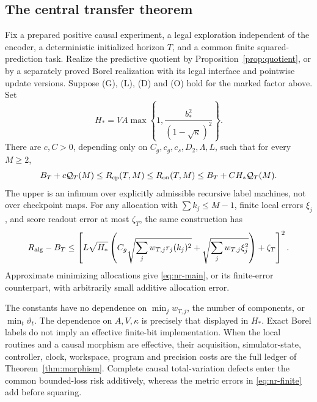 \subsection{The central transfer theorem}
\begin{theorem}\label{thm:nonreset}
Fix a prepared positive causal experiment, a legal exploration independent of the encoder, a deterministic initialized horizon $T$, and a common finite squared-prediction task. Realize the predictive quotient by Proposition~\ref{prop:quotient}, or by a separately proved Borel realization with its legal interface and pointwise update versions. Suppose \textup{(G)}, \textup{(L)}, \textup{(D)} and \textup{(O)} hold for the marked factor above. Set
\begin{equation}\label{eq:nr-H}
 H_*=VA\max\left\{1,\frac{b_*^2}{(1-\sqrt\kappa)^2}\right\}.
\end{equation}
There are $c,C>0$, depending only on $C_g,c_g,c_s,D_2,\Lambda,L$, such that for every $M\ge2$,
\begin{equation}\label{eq:nr-main}
 B_T+c\mathcal Q_T(M)\le R_{\mathrm{cp}}(T,M)\le R_{\mathrm{on}}(T,M)
                 \le B_T+C H_*\mathcal Q_T(M).
\end{equation}
The upper is an infimum over explicitly admissible recursive label machines, not over checkpoint maps. For any allocation with $\sum k_j\le M-1$, finite local errors $\xi_j$, and score readout error at most $\zeta_T$, the same construction has
\begin{equation}\label{eq:nr-finite}
 R_{\rm alg}-B_T\le
 \left[L\sqrt{H_*}\left(C_g\sqrt{\sum_jw_{T,j}r_j(k_j)^2}
                  +\sqrt{\sum_jw_{T,j}\xi_j^2}\right)+\zeta_T\right]^2.
\end{equation}
Approximate minimizing allocations give \eqref{eq:nr-main}, or its finite-error counterpart, with arbitrarily small additive allocation error.

The constants have no dependence on $\min_j w_{T,j}$, the number of components, or $\min_t\vartheta_t$. The dependence on $A,V,\kappa$ is precisely that displayed in $H_*$. Exact Borel labels do not imply an effective finite-bit implementation. When the local routines and a causal morphism are effective, their acquisition, simulator-state, controller, clock, workspace, program and precision costs are the full ledger of Theorem~\ref{thm:morphism}. Complete causal total-variation defects enter the common bounded-loss risk additively, whereas the metric errors in \eqref{eq:nr-finite} add before squaring.
\end{theorem}

